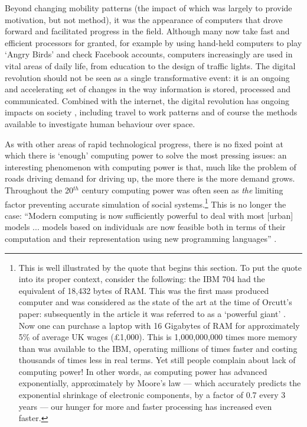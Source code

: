 \documentclass[a4paper, 11pt, twoside]{Thesis}
\begin{document}
Beyond changing mobility patterns (the impact of which was largely to provide
motivation, but not method), it was the appearance of computers that drove
forward and facilitated progress in the field. Although many now
take fast and efficient processors for granted, for example by using hand-held computers
to play `Angry Birds' and check Facebook accounts, computers increasingly are used in vital areas of
daily life, from
education to the design of traffic lights. The digital revolution should not
be seen as a single transformative event: it is an ongoing and accelerating
set of changes in the way information is stored, processed and communicated.
Combined with the internet, the digital revolution has ongoing
impacts on society \citep{Rushkoff2011}, including travel to work patterns
\citep{Orloff2003} and of course the methods available to investigate human
behaviour over space.

As with other areas of rapid technological progress, there is no
fixed point at which there is `enough' computing power to solve the
most pressing issues: an interesting phenomenon with computing power
is that, much like the problem of roads driving demand for driving up, the more
there is the more demand grows. Throughout the 20$^{th}$ century computing power
was often seen
as \emph{the} limiting factor preventing accurate simulation of social
systems.\footnote{This
is well illustrated by the quote that begins this section. To
put the quote into its proper context, consider the following: the
IBM 704 had the equivalent of 18,432 bytes of RAM. This was the first mass
produced computer and was
considered as the state of the art at the time of Orcutt's paper:
subsequently in the article it was referred to as a `powerful giant'
\citep{Orcutt1957-new-type}. Now one can purchase a laptop with 16 Gigabytes of
RAM for approximately 5\% of average UK wages (\pounds1,000). This is
1,000,000,000
times more memory than was available to the IBM, operating millions of times
faster and costing thousands of times less in real terms. Yet still people
complain about lack of computing power! In other words, as computing power has
advanced exponentially, approximately by Moore's law --- which accurately
predicts the exponential shrinkage of electronic components, by a factor of 0.7
every 3 years \citep{kish2002end} --- our hunger for more and faster processing
has increased even faster.
}
This is no longer the case: ``Modern computing is now sufficiently powerful to
deal with most [urban] models ... models based on individuals are
now feasible both in terms of their computation and their representation
using new programming languages'' \citep[p.~5]{batty2007cities}.
\end{document}
